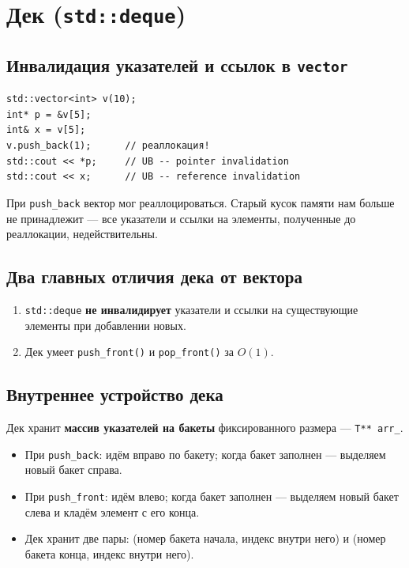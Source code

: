 \documentclass[a4paper,12pt]{article}
\begin{document}
\newpage
\section{Дек (\texttt{std::deque})}

\subsection{Инвалидация указателей и ссылок в \texttt{vector}}

\begin{lstlisting}
std::vector<int> v(10);
int* p = &v[5];
int& x = v[5];
v.push_back(1);      // реаллокация!
std::cout << *p;     // UB -- pointer invalidation
std::cout << x;      // UB -- reference invalidation
\end{lstlisting}

При \texttt{push\_back} вектор мог реаллоцироваться. Старый кусок
памяти нам больше не принадлежит --- все указатели и ссылки на элементы,
полученные до реаллокации, недействительны.

\subsection{Два главных отличия дека от вектора}

\begin{enumerate}
    \item \texttt{std::deque} \textbf{не инвалидирует} указатели и ссылки
          на существующие элементы при добавлении новых.
    \item Дек умеет \texttt{push\_front()} и \texttt{pop\_front()} за $O(1)$.
\end{enumerate}

\subsection{Внутреннее устройство дека}

Дек хранит \textbf{массив указателей на бакеты} фиксированного размера ---
\texttt{T** arr\_}.

\begin{itemize}
    \item При \texttt{push\_back}: идём вправо по бакету; когда бакет
          заполнен --- выделяем новый бакет справа.
    \item При \texttt{push\_front}: идём влево; когда бакет заполнен ---
          выделяем новый бакет слева и кладём элемент с его конца.
    \item Дек хранит две пары: (номер бакета начала, индекс внутри него)
          и (номер бакета конца, индекс внутри него).
\end{itemize}
\end{document}

